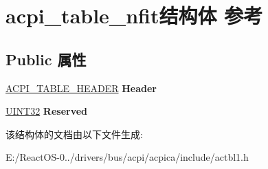 \hypertarget{structacpi__table__nfit}{}\section{acpi\+\_\+table\+\_\+nfit结构体 参考}
\label{structacpi__table__nfit}
\subsection*{Public 属性}
\begin{DoxyCompactItemize}
\item 
\mbox{\label{structacpi__table__nfit_a4235f44d7e0f72901fdbf5376c7c9098}} 
\hyperlink{structacpi__table__header}{A\+C\+P\+I\+\_\+\+T\+A\+B\+L\+E\+\_\+\+H\+E\+A\+D\+ER} {\bfseries Header}
\item 
\mbox{\label{structacpi__table__nfit_a12969cf51f8f2f4748c7cb9d1757ff37}} 
\hyperlink{_processor_bind_8h_ae1e6edbbc26d6fbc71a90190d0266018}{U\+I\+N\+T32} {\bfseries Reserved}
\end{DoxyCompactItemize}


该结构体的文档由以下文件生成\+:\begin{DoxyCompactItemize}
\item 
E\+:/\+React\+O\+S-\/0../drivers/bus/acpi/acpica/include/actbl1.\+h\end{DoxyCompactItemize}
